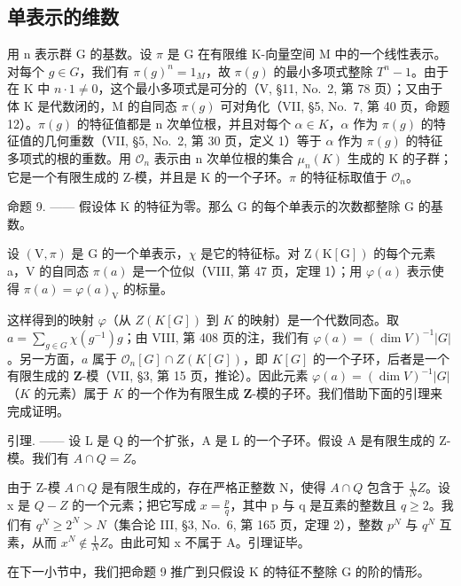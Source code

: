 \subsection{单表示的维数}

用 n 表示群 G 的基数。设 \(\pi\) 是 G 在有限维 K-向量空间 M 中的一个线性表示。对每个 \(g \in G\)，我们有 \(\pi(g)^{n} = 1_{M}\)，故 \(\pi(g)\) 的最小多项式整除 \(T^{n} - 1\)。由于在 K 中 \(n \cdot 1 \neq 0\)，这个最小多项式是可分的（V, §11, No.~2, 第 78 页）；又由于体 K 是代数闭的，M 的自同态 \(\pi(g)\) 可对角化（VII, §5, No.~7, 第 40 页，命题 12）。\(\pi(g)\) 的特征值都是 n 次单位根，并且对每个 \(\alpha \in K\)，\(\alpha\) 作为 \(\pi(g)\) 的特征值的几何重数（VII, §5, No.~2, 第 30 页，定义 1）等于 \(\alpha\) 作为 \(\pi(g)\) 的特征多项式的根的重数。用 \(\mathcal{O}_{n}\) 表示由 n 次单位根的集合 \(\mu_{n}(K)\) 生成的 K 的子群；它是一个有限生成的 Z-模，并且是 K 的一个子环。\(\pi\) 的特征标取值于 \(\mathcal{O}_{n}\)。

命题 9. —— 假设体 K 的特征为零。那么 G 的每个单表示的次数都整除 G 的基数。

设 \((\mathrm{V},\pi)\) 是 G 的一个单表示，\(\chi\) 是它的特征标。对 \(\mathrm{Z}(\mathrm{K}[\mathrm{G}])\) 的每个元素 a，V 的自同态 \(\pi(a)\) 是一个位似（VIII, 第 47 页，定理 1）；用 \(\varphi(a)\) 表示使得 \(\pi(a)=\varphi(a)_{\mathrm{V}}\) 的标量。

这样得到的映射 \(\varphi\)（从 \(Z(K[G])\) 到 \(K\) 的映射）是一个代数同态。取 \(a = \sum_{g \in G} \chi(g^{-1})g\)；由 VIII, 第 408 页的注，我们有 \(\varphi(a) = (\dim V)^{-1}|G|\)。另一方面，\(a\) 属于 \(\mathcal{O}_n[G] \cap Z(K[G])\)，即 \(K[G]\) 的一个子环，后者是一个有限生成的 \(\mathbf{Z}\)-模（VII, §3, 第 15 页，推论）。因此元素 \(\varphi(a) = (\dim V)^{-1}|G|\)（\(K\) 的元素）属于 \(K\) 的一个作为有限生成 \(\mathbf{Z}\)-模的子环。我们借助下面的引理来完成证明。

引理. —— 设 L 是 Q 的一个扩张，A 是 L 的一个子环。假设 A 是有限生成的 Z-模。我们有 \(A \cap Q = Z\)。

由于 Z-模 \(A \cap Q\) 是有限生成的，存在严格正整数 N，使得 \(A \cap Q\) 包含于 \(\frac{1}{N}Z\)。设 x 是 \(Q - Z\) 的一个元素；把它写成 \(x = \frac{p}{q}\)，其中 p 与 q 是互素的整数且 \(q \geqslant 2\)。我们有 \(q^{N} \geqslant 2^{N} > N\)（集合论 III, §3, No.~6, 第 165 页，定理 2），整数 \(p^{N}\) 与 \(q^{N}\) 互素，从而 \(x^{N} \notin \frac{1}{N}Z\)。由此可知 x 不属于 A。引理证毕。

在下一小节中，我们把命题 9 推广到只假设 K 的特征不整除 G 的阶的情形。

